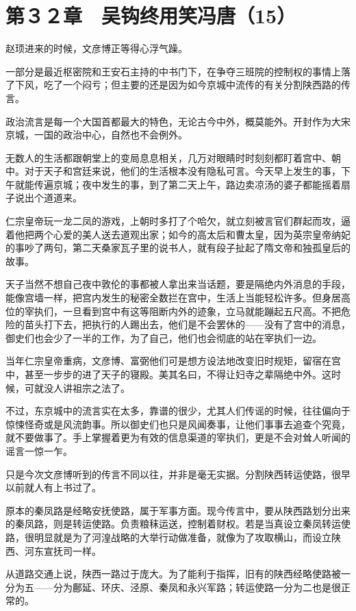 \section{第３２章　吴钩终用笑冯唐（15）}

赵顼进来的时候，文彦博正等得心浮气躁。

一部分是最近枢密院和王安石主持的中书门下，在争夺三班院的控制权的事情上落了下风，吃了一个闷亏；但主要的还是因为如今京城中流传的有关分割陕西路的传言。

政治流言是每一个大国首都最大的特色，无论古今中外，概莫能外。开封作为大宋京城，一国的政治中心，自然也不会例外。

无数人的生活都跟朝堂上的变局息息相关，几万对眼睛时时刻刻都盯着宫中、朝中。对于天子和宫廷来说，他们的生活根本没有隐私可言。今天早上发生的事，下午就能传遍京城；夜中发生的事，到了第二天上午，路边卖凉汤的婆子都能摇着扇子说出个道道来。

仁宗皇帝玩一龙二凤的游戏，上朝时多打了个哈欠，就立刻被言官们群起而攻，逼着他把两个心爱的美人送去道观出家；如今的高太后和曹太皇，因为英宗皇帝纳妃的事吵了两句，第二天桑家瓦子里的说书人，就有段子扯起了隋文帝和独孤皇后的故事。

天子当然不想自己夜中敦伦的事都被人拿出来当话题，要是隔绝内外消息的手段，能像宫墙一样，把宫内发生的秘密全数拦在宫中，生活上当能轻松许多。但身居高位的宰执们，一旦看到宫中有这等阻断内外的迹象，立马就能蹦起五尺高。不把危险的苗头打下去，把执行的人踢出去，他们是不会罢休的——没有了宫中的消息，御史们也会少了一半的工作，为了自己，他们也会彻底的站在宰执们一边。

当年仁宗皇帝重病，文彦博、富弼他们可是想方设法地改变旧时规矩，留宿在宫中，甚至一步步的进了天子的寝殿。美其名曰，不得让妇寺之辈隔绝中外。这时候，可就没人讲祖宗之法了。

不过，东京城中的流言实在太多，靠谱的很少，尤其人们传谣的时候，往往偏向于惊悚怪奇或是风流韵事。所以御史们也只是风闻奏事，让他们事事去追查个究竟，就不要做事了。手上掌握着更为有效的信息渠道的宰执们，更是不会对耸人听闻的谣言一惊一乍。

只是今次文彦博听到的传言不同以往，并非是毫无实据。分割陕西转运使路，很早以前就人有上书过了。

原本的秦凤路是经略安抚使路，属于军事方面。现今传言中，要从陕西路划分出来的秦凤路，则是转运使路。负责粮秣运送，控制着财权。若是当真设立秦凤转运使路，很明显就是为了河湟战略的大举行动做准备，就像为了攻取横山，而设立陕西、河东宣抚司一样。

从道路交通上说，陕西一路过于庞大。为了能利于指挥，旧有的陕西经略使路被一分为五——分为鄜延、环庆、泾原、秦凤和永兴军路；转运使路一分为二也是很正常的。

